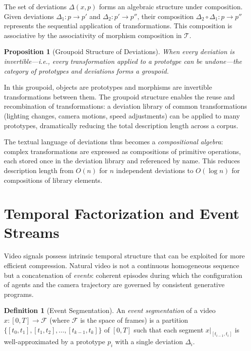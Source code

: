 \documentclass[12pt,a4paper]{article}
\newtheorem{proposition}[theorem]{Proposition}
\theoremstyle{definition}
\newtheorem{definition}[theorem]{Definition}
\theoremstyle{remark}
\begin{document}
The set of deviations $\Delta(x,p)$ forms an algebraic structure under composition. Given deviations $\Delta_1 : p \rightarrow p'$ and $\Delta_2 : p' \rightarrow p''$, their composition $\Delta_2 \circ \Delta_1 : p \rightarrow p''$ represents the sequential application of transformations. This composition is associative by the associativity of morphism composition in $\mathcal{T}$.

\begin{proposition}[Groupoid Structure of Deviations]
When every deviation is invertible---i.e., every transformation applied to a prototype can be undone---the category of prototypes and deviations forms a \emph{groupoid}.
\end{proposition}

In this groupoid, objects are prototypes and morphisms are invertible transformations between them. The groupoid structure enables the reuse and recombination of transformations: a deviation library of common transformations (lighting changes, camera motions, speed adjustments) can be applied to many prototypes, dramatically reducing the total description length across a corpus.

The textual language of deviations thus becomes a \emph{compositional algebra}: complex transformations are expressed as compositions of primitive operations, each stored once in the deviation library and referenced by name. This reduces description length from $O(n)$ for $n$ independent deviations to $O(\log n)$ for compositions of library elements.

\section{Temporal Factorization and Event Streams}
\label{sec:temporal}

Video signals possess intrinsic temporal structure that can be exploited for more efficient compression. Natural video is not a continuous homogeneous sequence but a concatenation of \emph{events}: coherent episodes during which the configuration of agents and the camera trajectory are governed by consistent generative programs.

\begin{definition}[Event Segmentation]
An \emph{event segmentation} of a video $x : [0,T] \rightarrow \mathcal{F}$ (where $\mathcal{F}$ is the space of frames) is a partition $\{[t_0, t_1], [t_1, t_2], \dots, [t_{k-1}, t_k]\}$ of $[0,T]$ such that each segment $x|_{[t_{i-1}, t_i]}$ is well-approximated by a prototype $p_i$ with a single deviation $\Delta_i$.
\end{definition}
\end{document}
